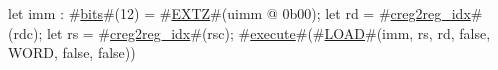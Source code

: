 let imm : #\hyperref[sailRISCVzbits]{bits}#(12) = #\hyperref[sailRISCVzEXTZ]{EXTZ}#(uimm @ 0b00);
let rd = #\hyperref[sailRISCVzcreg2regzyidx]{creg2reg\_idx}#(rdc);
let rs = #\hyperref[sailRISCVzcreg2regzyidx]{creg2reg\_idx}#(rsc);
#\hyperref[sailRISCVzexecute]{execute}#(#\hyperref[sailRISCVzLOAD]{LOAD}#(imm, rs, rd, false, WORD, false, false))
